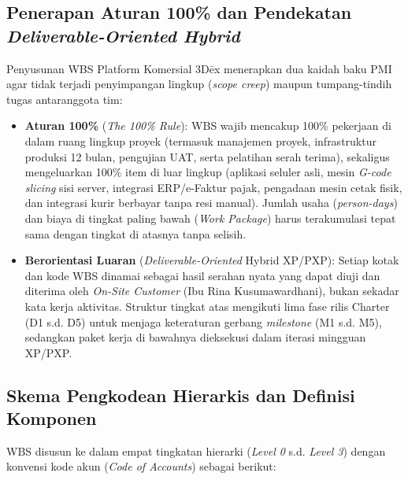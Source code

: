 \documentclass[11pt,a4paper]{article}
\begin{document}
\subsection{Penerapan Aturan 100\% dan Pendekatan \textit{Deliverable-Oriented Hybrid}}
Penyusunan WBS Platform Komersial 3D\={e}x menerapkan dua kaidah baku PMI agar tidak terjadi penyimpangan lingkup (\textit{scope creep}) maupun tumpang-tindih tugas antaranggota tim:
\begin{itemize}[leftmargin=1.5em, itemsep=2pt]
    \item \textbf{Aturan 100\%} (\textit{The 100\% Rule}): WBS wajib mencakup 100\% pekerjaan di dalam ruang lingkup proyek (termasuk manajemen proyek, infrastruktur produksi 12 bulan, pengujian UAT, serta pelatihan serah terima), sekaligus mengeluarkan 100\% item di luar lingkup (aplikasi seluler asli, mesin \textit{G-code slicing} sisi server, integrasi ERP/e-Faktur pajak, pengadaan mesin cetak fisik, dan integrasi kurir berbayar tanpa resi manual). Jumlah usaha (\textit{person-days}) dan biaya di tingkat paling bawah (\textit{Work Package}) harus terakumulasi tepat sama dengan tingkat di atasnya tanpa selisih.
    \item \textbf{Berorientasi Luaran} (\textit{Deliverable-Oriented} Hybrid XP/PXP): Setiap kotak dan kode WBS dinamai sebagai hasil serahan nyata yang dapat diuji dan diterima oleh \textit{On-Site Customer} (Ibu Rina Kusumawardhani), bukan sekadar kata kerja aktivitas. Struktur tingkat atas mengikuti lima fase rilis Charter (D1 s.d. D5) untuk menjaga keteraturan gerbang \textit{milestone} (M1 s.d. M5), sedangkan paket kerja di bawahnya dieksekusi dalam iterasi mingguan XP/PXP.
\end{itemize}

\subsection{Skema Pengkodean Hierarkis dan Definisi Komponen}
WBS disusun ke dalam empat tingkatan hierarki (\textit{Level 0} s.d. \textit{Level 3}) dengan konvensi kode akun (\textit{Code of Accounts}) sebagai berikut:
\end{document}
